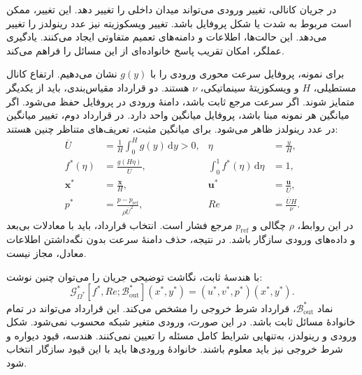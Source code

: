 \label{sec:lit-variable-inlet-flow}

در جریان کانالی، تغییر ورودی می‌تواند میدان داخلی را تغییر دهد.
این تغییر، ممکن است مربوط به شدت یا شکل پروفایل باشد.
تغییر ویسکوزیته نیز عدد رینولدز را تغییر می‌دهد.
این حالت‌ها، اطلاعات و دامنه‌های تعمیم متفاوتی ایجاد می‌کنند.
یادگیری عملگر، امکان تقریب پاسخ خانواده‌ای از این مسائل را فراهم می‌کند.
\cite{lu2021deeponet,wang2021pideeponet}

برای نمونه، پروفایل سرعت محوری ورودی را با $g(y)$ نشان می‌دهیم.
ارتفاع کانال مستطیلی، $H$ و ویسکوزیتهٔ سینماتیکی، $\nu$ هستند.
دو قرارداد مقیاس‌بندی، باید از یکدیگر متمایز شوند.
اگر سرعت مرجع ثابت باشد، دامنهٔ ورودی در پروفایل حفظ می‌شود.
اگر میانگین هر نمونه مبنا باشد، پروفایل میانگین واحد دارد.
در قرارداد دوم، تغییر میانگین در عدد رینولدز ظاهر می‌شود.
برای میانگین مثبت، تعریف‌های متناظر چنین هستند:
\begin{equation}
\begin{aligned}
\overline{U}&=\frac{1}{H}\int_0^H g(y)\,\mathrm{d}y>0,
&\eta&=\frac{y}{H},\\
f^{*}(\eta)&=\frac{g(H\eta)}{\overline{U}},
&\int_0^1 f^{*}(\eta)\,\mathrm{d}\eta&=1,\\
\mathbf{x}^{*}&=\frac{\mathbf{x}}{H},
&\mathbf{u}^{*}&=\frac{\mathbf{u}}{\overline{U}},\\
p^{*}&=\frac{p-p_{\mathrm{ref}}}{\rho\overline{U}^{2}},
&Re&=\frac{\overline{U}H}{\nu}.
\end{aligned}
\label{eq:lit-inlet-shape-scaling}
\end{equation}
در این روابط، $\rho$ چگالی و $p_{\mathrm{ref}}$ مرجع فشار است.
انتخاب قرارداد، باید با معادلات بی‌بعد و داده‌های ورودی سازگار باشد.
در نتیجه، حذف دامنهٔ سرعت بدون نگه‌داشتن اطلاعات معادل، مجاز نیست.

با هندسهٔ ثابت، نگاشت توضیحی جریان را می‌توان چنین نوشت:
\begin{equation}
\mathcal{G}^{*}_{\Omega^{*}}
\left[f^{*},Re;\mathcal{B}^{*}_{\mathrm{out}}\right](x^{*},y^{*})
=\left(u^{*},v^{*},p^{*}\right)(x^{*},y^{*}).
\label{eq:lit-inlet-flow-operator}
\end{equation}
نماد $\mathcal{B}^{*}_{\mathrm{out}}$، قرارداد شرط خروجی را مشخص می‌کند.
این قرارداد می‌تواند در تمام خانوادهٔ مسائل ثابت باشد.
در این صورت، ورودی متغیر شبکه محسوب نمی‌شود.
شکل ورودی و رینولدز، به‌تنهایی شرایط کامل مسئله را تعیین نمی‌کنند.
هندسه، قیود دیواره و شرط خروجی نیز باید معلوم باشند.
خانوادهٔ ورودی‌ها باید با این قیود سازگار انتخاب شود.

